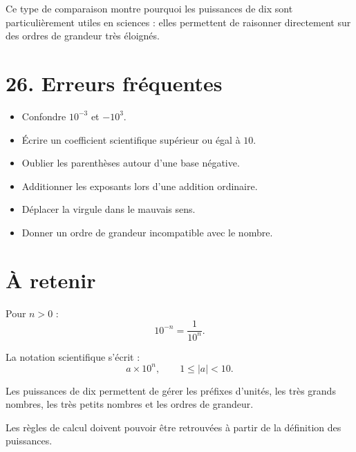 Ce type de comparaison montre pourquoi les puissances de dix sont particulièrement utiles en sciences : elles permettent de raisonner directement sur des ordres de grandeur très éloignés.

\section{26. Erreurs fréquentes}

\begin{itemize}
\item Confondre $10^{-3}$ et $-10^3$.
\item Écrire un coefficient scientifique supérieur ou égal à $10$.
\item Oublier les parenthèses autour d'une base négative.
\item Additionner les exposants lors d'une addition ordinaire.
\item Déplacer la virgule dans le mauvais sens.
\item Donner un ordre de grandeur incompatible avec le nombre.
\end{itemize}

\section{À retenir}

\begin{aretenir}
Pour $n>0$ :
\[
\boxed{10^{-n}=\dfrac1{10^n}}.
\]

La notation scientifique s'écrit :
\[
\boxed{a\times10^n,\qquad1\le|a|<10}.
\]

Les puissances de dix permettent de gérer les préfixes d'unités, les très grands nombres, les très petits nombres et les ordres de grandeur.

Les règles de calcul doivent pouvoir être retrouvées à partir de la définition des puissances.
\end{aretenir}

